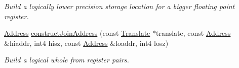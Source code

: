\begin{DoxyCompactItemize}
\begin{DoxyCompactList}\small\item\em Build a logically lower precision storage location for a bigger floating point register. \end{DoxyCompactList}\item 
\mbox{\hyperlink{class_address}{Address}} \mbox{\hyperlink{class_addr_space_manager_a1cfc5383270584be6e9b974114e65f13}{construct\+Join\+Address}} (const \mbox{\hyperlink{class_translate}{Translate}} $\ast$translate, const \mbox{\hyperlink{class_address}{Address}} \&hiaddr, int4 hisz, const \mbox{\hyperlink{class_address}{Address}} \&loaddr, int4 losz)
\begin{DoxyCompactList}\small\item\em Build a logical whole from register pairs. \end{DoxyCompactList}\end{DoxyCompactItemize}
